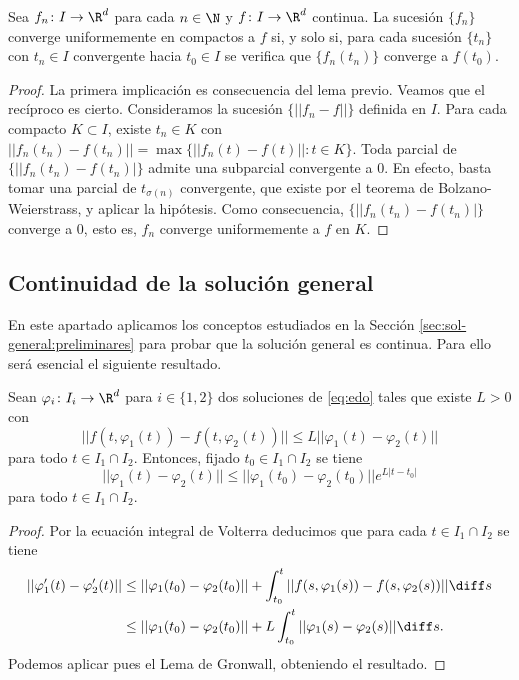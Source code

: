 \begin{proposition}
  Sea $f_n \colon I \to \R^d$ para cada $n \in \N$ y $f \colon I \to \R^d$ continua. La sucesión
  $\{f_n\}$ converge uniformemente en compactos a $f$ si, y solo si, para cada sucesión $\{t_n\}$
  con $t_n \in I$ convergente hacia $t_0 \in I$ se verifica que $\{f_n(t_n)\}$ converge a $f(t_0)$.
\end{proposition}
\begin{proof}
  La primera implicación es consecuencia del lema previo. Veamos que el recíproco es
  cierto. Consideramos la sucesión $\{||f_n-f||\}$ definida en $I$. Para cada compacto
  $K \subset I$, existe $t_n \in K$ con $||f_n(t_n)-f(t_n)|| = \max \{||f_n(t)-f(t)|| : t \in
  K\}$. Toda parcial de $\{||f_n(t_n)-f(t_n)|\}$ admite una subparcial convergente a $0$. En efecto,
  basta tomar una parcial de $t_{\sigma(n)}$ convergente, que existe por el teorema de
  Bolzano-Weierstrass, y aplicar la hipótesis. Como consecuencia, $\{||f_n(t_n)-f(t_n)|\}$ converge
  a $0$, esto es, $f_n$ converge uniformemente a $f$ en $K$.
\end{proof}

\subsection{Continuidad de la solución general}

En este apartado aplicamos los conceptos estudiados en la Sección \ref{sec:sol-general:preliminares}
para probar que la solución general es continua. Para ello será esencial el siguiente resultado.

\begin{lemma}
  Sean $\varphi_i \colon I_i \to \R^d$ para $i \in \{1,2\}$ dos soluciones de \eqref{eq:edo} tales
  que existe $L > 0$ con
  \[ ||f(t, \varphi_1(t))-f(t, \varphi_2(t))|| \le L ||\varphi_1(t)-\varphi_2(t)|| \] para todo
  $t\in I_1\cap I_2$. Entonces, fijado $t_0 \in I_1\cap I_2$ se tiene
  \[ ||\varphi_1(t)-\varphi_2(t)|| \le ||\varphi_1(t_0)-\varphi_2(t_0)|| e^{L|t-t_0|} \] para todo
  $t\in I_1\cap I_2$.
\end{lemma}
\begin{proof}
  Por la ecuación integral de Volterra deducimos que para cada $t\in I_1\cap I_2$ se tiene
  \begin{align*}
    ||\varphi_1'(t) - \varphi_2'(t)|| & \le ||\varphi_1(t_0) - \varphi_2(t_0)|| + \int_{t_0}^{t}
                                        ||f(s, \varphi_1(s)) - f(s, \varphi_2(s))|| \diff s \\
                                      & \le ||\varphi_1(t_0) - \varphi_2(t_0)|| + L
                                        \int_{t_0}^{t} ||\varphi_1(s)-\varphi_2(s)|| \diff s.
  \end{align*}
  Podemos aplicar pues el Lema de Gronwall, obteniendo el resultado.
\end{proof}

